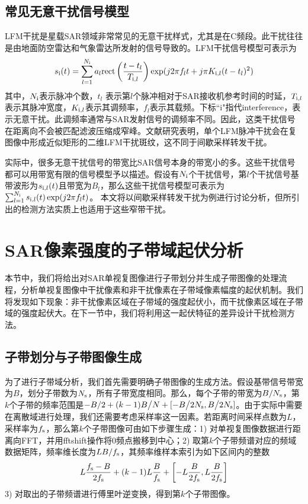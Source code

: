 \documentclass[10.5pt,UTF8]{JR}
\theoremstyle{mystyle}
\begin{document}
\subsection{常见无意干扰信号模型}

LFM干扰是星载SAR领域非常常见的无意干扰样式，尤其是在C频段。此干扰往往是由地面防空雷达和气象雷达所发射的信号导致的。LFM干扰信号模型可表示为
\begin{equation}\label{}
 s_{\rm i}(t)=\sum_{l=1}^{N_{\rm i}} a_l {\rm rect}\left(\frac{t-t_l}{T_{{\rm i},l}}\right)\exp(j2\pi f_lt+j\pi K_{{\rm i},l}(t-t_l)^2)
\end{equation}
其中，$N_{\rm i}$表示脉冲个数，$t_l$ 表示第$l$个脉冲相对于SAR接收机参考时间的时延，$T_{{\rm i},l}$表示其脉冲宽度，$K_{{\rm i},l}$表示其调频率，$f_l$表示其载频。下标``i"指代interference，表示无意干扰。此调频率通常与SAR发射信号的调频率不同。因此，这类干扰信号在距离向不会被匹配滤波压缩成窄峰。文献\cite{yang2020mutual}研究表明，单个LFM脉冲干扰会在复图像中形成近似矩形的二维LFM干扰斑纹，这不同于间歇采样转发干扰。

实际中，很多无意干扰信号的带宽比SAR信号本身的带宽小的多。这些干扰信号都可以用带宽有限的信号模型予以描述。假设有$N_{\rm i}$个干扰信号，第$l$个干扰信号基带波形为$s_{{\rm i},l}(t)$且带宽为$B_l$，那么这些干扰信号模型可表示为$\sum_{l=1}^{N_{\rm i}}  s_{{\rm i},l}(t)\exp(j2\pi f_l t)$。 
本文将以间歇采样转发干扰为例进行讨论分析，但所引出的检测方法实质上也适用于这些窄带干扰。

\section{SAR像素强度的子带域起伏分析}

本节中，我们将给出对SAR单视复图像进行子带划分并生成子带图像的处理流程，分析单视复图像中干扰像素和非干扰像素在子带域像素幅度的起伏机制。我们将发现如下现象：非干扰像素区域在子带域的强度起伏小，而干扰像素区域在子带域的强度起伏大。在下一节中，我们将利用这一起伏特征的差异设计干扰检测方法。

\subsection{子带划分与子带图像生成}

为了进行子带域分析，我们首先需要明确子带图像的生成方法。假设基带信号带宽为$B$，划分子带数为$N_{\rm s}$，所有子带宽度相同。那么，每个子带的带宽为$B/N_{\rm s}$，第$k$个子带的频率范围是$-B/2+(k -1)B\big/N +[-B\big/2N_{\rm s},B\big/2N_{\rm s}]$。由于实际中需要在离散域进行处理，我们还需要考虑采样率这一因素。若距离时间采样点数为$L$，采样率为$f_{\rm s}$，那么第$k$个子带图像可由如下步骤生成：1) 对单视复图像数据进行距离向FFT，并用fftshift操作将0频点搬移到中心；2) 取第$k$个子带频谱对应的频域数据矩阵，频率维长度为$L B/f_{\rm s}$，其频率维样本索引为如下区间内的整数 
\begin{equation}\label{}
   L \frac{f_{\rm s} - B}{2f_{\rm s}} +  (k -1)L \frac{B}{f_{\rm s}} + \left[-L \frac{B}{2f_{\rm s}},L \frac{B}{2f_{\rm s}} \right]
\end{equation}
3) 对取出的子带频谱进行傅里叶逆变换，得到第$k$个子带图像。
\end{document}

